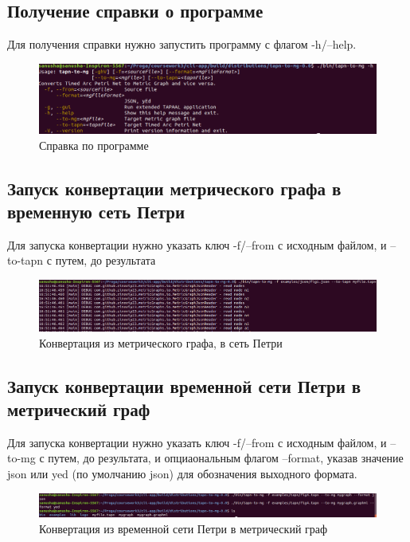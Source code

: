 \documentclass{../TechDoc}
\begin{document}
		\subsection{Получение справки о программе}
		Для получения справки нужно запустить программу с флагом -h/--help.
		\begin{figure}[h!]
			\centering
			\includegraphics[width=0.7\linewidth]{help}
			\caption{Справка по программе}
			\label{fig:help}
		\end{figure}
		
		\subsection{Запуск конвертации метрического графа в временную сеть Петри}\label{subsection:mg-to-tapn}
		Для запуска конвертации нужно указать ключ -f/--from с исходным файлом, и --to-tapn с путем, до результата
		\begin{figure}[h!]
			\centering
			\includegraphics[width=0.7\linewidth]{mg-to-tapn}
			\caption{Конвертация из метрического графа, в сеть Петри}
			\label{fig:mg-to-tapn}
		\end{figure}
		
		\subsection{Запуск конвертации временной сети Петри в метрический граф}\label{subsection:tapn-to-mg}
			Для запуска конвертации нужно указать ключ -f/--from с исходным файлом, и --to-mg с путем, до результата, и опциаональным флагом --format, указав значение json или yed (по умолчанию json) для обозначения выходного формата.
		\begin{figure}[h!]
			\centering
			\includegraphics[width=0.7\linewidth]{tapn-to-mg}
			\caption{Конвертация из временной сети Петри в метрический граф}
			\label{fig:tapn-to-mg}
		\end{figure}
		
\end{document}
